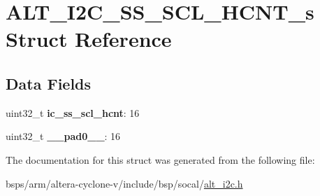 \hypertarget{structALT__I2C__SS__SCL__HCNT__s}{}\section{A\+L\+T\+\_\+\+I2\+C\+\_\+\+S\+S\+\_\+\+S\+C\+L\+\_\+\+H\+C\+N\+T\+\_\+s Struct Reference}
\label{structALT__I2C__SS__SCL__HCNT__s}
\subsection*{Data Fields}
\begin{DoxyCompactItemize}
\item 
\mbox{\label{structALT__I2C__SS__SCL__HCNT__s_a67c43fb87fed9a4cb92e77b3f619c41f}} 
uint32\+\_\+t {\bfseries ic\+\_\+ss\+\_\+scl\+\_\+hcnt}\+: 16
\item 
\mbox{\label{structALT__I2C__SS__SCL__HCNT__s_a31ce772c926a11a2ddad70d39cab78f5}} 
uint32\+\_\+t {\bfseries \+\_\+\+\_\+pad0\+\_\+\+\_\+}\+: 16
\end{DoxyCompactItemize}


The documentation for this struct was generated from the following file\+:\begin{DoxyCompactItemize}
\item 
bsps/arm/altera-\/cyclone-\/v/include/bsp/socal/\mbox{\hyperlink{socal_2alt__i2c_8h}{alt\+\_\+i2c.\+h}}\end{DoxyCompactItemize}
